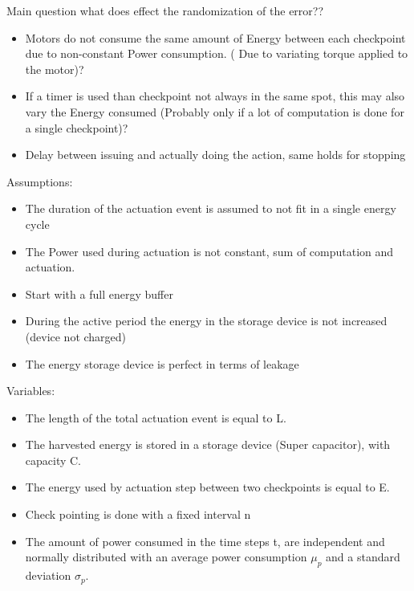 \documentclass[11pt,twoside,a4paper]{article}
\begin{document}
Main question what does effect the randomization of the error??
	
\begin{itemize}
\item Motors do not consume the same amount of Energy between each checkpoint due to non-constant Power consumption. ( Due to variating torque applied to the motor)?
\item If a timer is used than checkpoint not always in the same spot, this may also vary the Energy consumed (Probably only if a lot of computation is done for a single checkpoint)?
\item Delay between issuing and actually doing the action, same holds for stopping
\end{itemize}


Assumptions: \ 
\begin{itemize}
\item The duration of the actuation event is assumed to not fit in a single energy cycle
\item The Power used during actuation is not constant, sum of computation and actuation.
\item Start with a full energy buffer
\item During the active period the energy in the storage device is not increased (device not charged)
\item The energy storage device is perfect in terms of leakage
%

\end{itemize}


Variables: \\
\begin{itemize}
\item The length of the total actuation event is equal to L.
\item The harvested energy is stored in a storage device (Super capacitor), with capacity C.
\item The energy used by actuation step between two checkpoints is equal to E.
\item Check pointing is done with a fixed interval n
\item The amount of power consumed in the time steps t, are independent and normally distributed with an average power consumption $\mu_p$ and a standard deviation $\sigma_p$.
\end{itemize}
\end{document}
